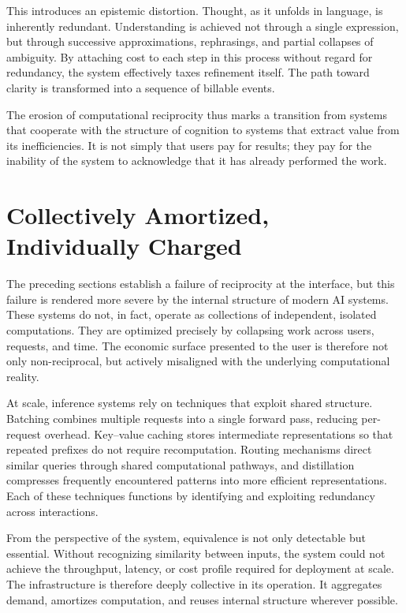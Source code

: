 \documentclass[12pt, oneside]{article}
\begin{document}
This introduces an epistemic distortion. Thought, as it unfolds in language, is inherently redundant. Understanding is achieved not through a single expression, but through successive approximations, rephrasings, and partial collapses of ambiguity. By attaching cost to each step in this process without regard for redundancy, the system effectively taxes refinement itself. The path toward clarity is transformed into a sequence of billable events.

The erosion of computational reciprocity thus marks a transition from systems that cooperate with the structure of cognition to systems that extract value from its inefficiencies. It is not simply that users pay for results; they pay for the inability of the system to acknowledge that it has already performed the work.

\section{Collectively Amortized, Individually Charged}

The preceding sections establish a failure of reciprocity at the interface, but this failure is rendered more severe by the internal structure of modern AI systems. These systems do not, in fact, operate as collections of independent, isolated computations. They are optimized precisely by collapsing work across users, requests, and time. The economic surface presented to the user is therefore not only non-reciprocal, but actively misaligned with the underlying computational reality.

At scale, inference systems rely on techniques that exploit shared structure. Batching combines multiple requests into a single forward pass, reducing per-request overhead. Key--value caching stores intermediate representations so that repeated prefixes do not require recomputation. Routing mechanisms direct similar queries through shared computational pathways, and distillation compresses frequently encountered patterns into more efficient representations. Each of these techniques functions by identifying and exploiting redundancy across interactions.

From the perspective of the system, equivalence is not only detectable but essential. Without recognizing similarity between inputs, the system could not achieve the throughput, latency, or cost profile required for deployment at scale. The infrastructure is therefore deeply collective in its operation. It aggregates demand, amortizes computation, and reuses internal structure wherever possible.
\end{document}
